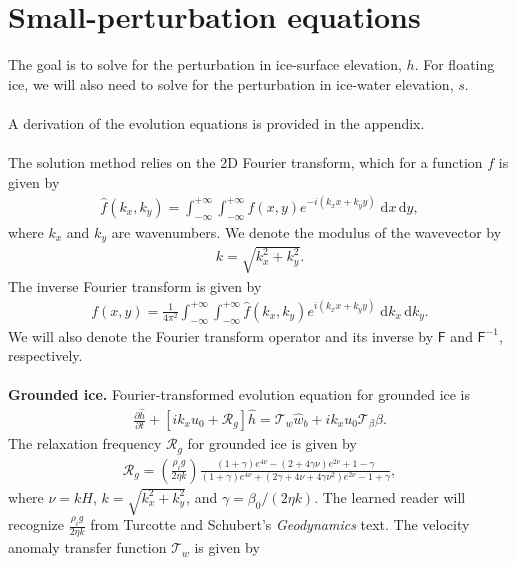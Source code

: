 \documentclass[paper=a4, fontsize=11pt]{article}
\begin{document}
\section*{Small-perturbation equations}
The goal is to solve for the perturbation in ice-surface elevation, $h$.
For floating ice, we will also need to solve for the perturbation
in ice-water elevation, $s$. \\ \\
A derivation of the evolution equations is provided in the appendix.
\\ \\
The solution method relies on the 2D Fourier transform, which for a function $f$
is given by
\begin{align}
\widehat{f}(k_x,k_y)  = \int_{-\infty}^{+\infty}\int_{-\infty}^{+\infty} f(x,y)e^{-i(k_x x + k_y y)} \; \mathrm{d}x\,\mathrm{d}y,
\end{align}
where $k_x$ and $k_y$ are wavenumbers. We denote the modulus of the wavevector by
\begin{align}
k = \sqrt{k_x^2 + k_y^2}.
\end{align}
The inverse Fourier transform is given by
\begin{align}
{f}(x,y) = \frac{1}{4\pi^2}\int_{-\infty}^{+\infty}\int_{-\infty}^{+\infty} \widehat{f}(k_x,k_y)e^{i(k_x x + k_y y)} \; \mathrm{d}k_x \, \mathrm{d}k_y.
\end{align}
We will also denote the Fourier transform operator and its inverse by $\mathsf{F}$ and
$\mathsf{F}^{-1}$, respectively.
\\ \\
\textbf{Grounded ice.} Fourier-transformed evolution equation for grounded ice is
\begin{align}
\frac{\partial \widehat{h}}{\partial t}+ \left[ik_xu_0  + \mathcal{R}_g\right]\widehat{h} = \mathcal{T}_w\widehat{w}_b+ik_xu_0\mathcal{T}_{\beta} \widehat{\beta}.
\end{align}
The relaxation frequency $\mathcal{R}_g$ for grounded ice is given by
\begin{align}
\mathcal{R}_g = \left(\frac{\rho_i g }{2\eta k}\right)\frac{ (1+\gamma)e^{4\nu} -(2+4\gamma\nu)e^{2\nu} +1-\gamma  }{ (1+\gamma)e^{4\nu} + (2\gamma+4\nu+4\gamma\nu^2)e^{2\nu} -1 + \gamma  },
\end{align}
where $\nu = kH$, $k=\sqrt{k_x^2+k_y^2}$, and $\gamma = \beta_0/(2\eta k)$.
The learned reader will recognize $\frac{\rho_i g }{2\eta k}$ from Turcotte and Schubert's \emph{Geodynamics} text.
The velocity anomaly transfer function $\mathcal{T}_w$ is given by
\end{document}
